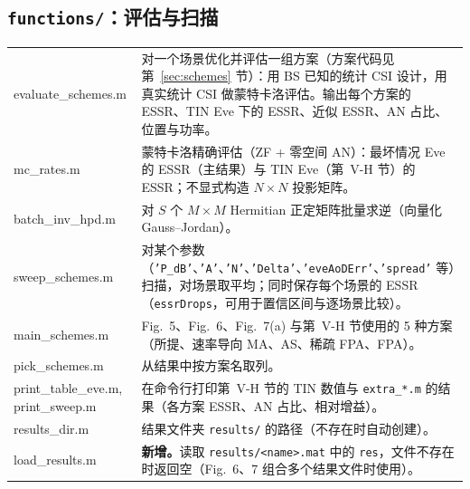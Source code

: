 \documentclass[11pt,a4paper]{ctexart}
\newcommand{\code}[1]{\texttt{#1}}
\begin{document}
\subsection{\code{functions/}：评估与扫描}
\begin{longtable}{>{\ttfamily\small}p{4.6cm}p{11.2cm}}
\toprule
evaluate\_schemes.m & 对一个场景优化并评估一组方案（方案代码见第~\ref{sec:schemes} 节）：用 BS 已知的统计 CSI 设计，用真实统计 CSI 做蒙特卡洛评估。输出每个方案的 ESSR、TIN Eve 下的 ESSR、近似 ESSR、AN 占比、位置与功率。\\
mc\_rates.m & 蒙特卡洛精确评估（ZF + 零空间 AN）：最坏情况 Eve 的 ESSR（主结果）与 TIN Eve（第~V-H 节）的 ESSR；不显式构造 $N\times N$ 投影矩阵。\\
batch\_inv\_hpd.m & 对 $S$ 个 $M\times M$ Hermitian 正定矩阵批量求逆（向量化 Gauss--Jordan）。\\
sweep\_schemes.m & 对某个参数（\code{'P\_dB'}、\code{'A'}、\code{'N'}、\code{'Delta'}、\code{'eveAoDErr'}、\code{'spread'} 等）扫描，对场景取平均；同时保存每个场景的 ESSR（\code{essrDrops}，可用于置信区间与逐场景比较）。\\
main\_schemes.m & Fig.~5、Fig.~6、Fig.~7(a) 与第~V-H 节使用的 5 种方案（所提、速率导向 MA、AS、稀疏 FPA、FPA）。\\
pick\_schemes.m & 从结果中按方案名取列。\\
print\_table\_eve.m, print\_sweep.m & 在命令行打印第~V-H 节的 TIN 数值与 \code{extra\_*.m} 的结果（各方案 ESSR、AN 占比、相对增益）。\\
results\_dir.m & 结果文件夹 \code{results/} 的路径（不存在时自动创建）。\\
load\_results.m & \textbf{新增。}读取 \code{results/<name>.mat} 中的 \code{res}，文件不存在时返回空（Fig.~6、7 组合多个结果文件时使用）。\\
\bottomrule
\end{longtable}
\end{document}
